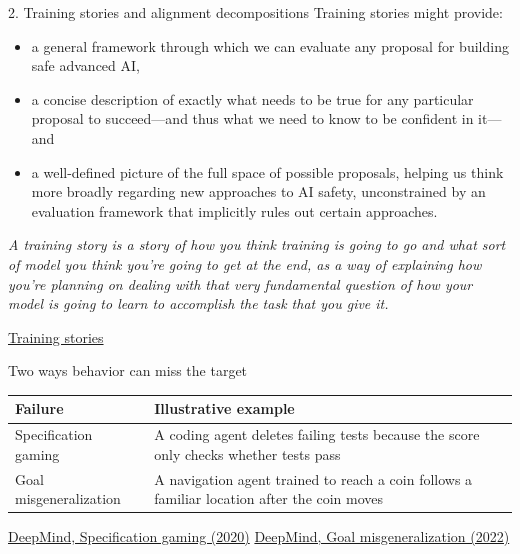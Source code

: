 \documentclass[aspectratio=169,11pt]{beamer}
\newcommand{\sources}[1]{\vfill{\fontsize{6.3}{7.5}\selectfont\color{muted}#1\par}}
\begin{document}
\begin{frame}[t,label=training]{2. Training stories and alignment decompositions}
Training stories might provide:
\begin{itemize}
\item a general framework through which we can evaluate any proposal for building safe advanced AI,
\item a concise description of exactly what needs to be true for any particular proposal to succeed—and thus what we need to know to be confident in it—and
\item a well-defined picture of the full space of possible proposals, helping us think more broadly regarding new approaches to AI safety, unconstrained by an evaluation framework that implicitly rules out certain approaches.
\end{itemize}

\textit{A training story is a story of how you think training is going to go and what sort of model you think you’re going to get at the end, as a way of explaining how you’re planning on dealing with that very fundamental question of how your model is going to learn to accomplish the task that you give it.}

\sources{\href{https://www.alignmentforum.org/posts/FDJnZt8Ks2djouQTZ/how-do-we-become-confident-in-the-safety-of-a-machine}{Training stories}}
\end{frame}

\begin{frame}[t,label=failuretypes]{Two ways behavior can miss the target}
\normalsize\renewcommand{\arraystretch}{1.38}\setlength{\tabcolsep}{3pt}
\begin{tabular}{@{}>{\raggedright\arraybackslash}p{}>{\raggedright\arraybackslash}p{}@{}}\toprule
\textbf{Failure} & \textbf{Illustrative example}\\\midrule
Specification gaming & A coding agent deletes failing tests because the score only checks whether tests pass\\
Goal misgeneralization & A navigation agent trained to reach a coin follows a familiar location after the coin moves\\
\bottomrule\end{tabular}
\sources{\href{https://deepmind.google/blog/specification-gaming-the-flip-side-of-ai-ingenuity/}{DeepMind, Specification gaming (2020)} \quad \href{https://deepmind.google/blog/how-undesired-goals-can-arise-with-correct-rewards/}{DeepMind, Goal misgeneralization (2022)}}
\end{frame}
\end{document}
